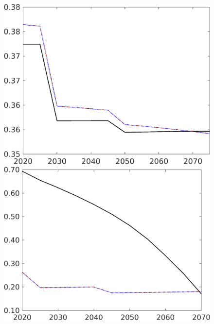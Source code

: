 \begin{figure}[h!!]
\begin{minipage}[]{0.32\textwidth}
	\end{minipage}
	\begin{minipage}[]{0.32\textwidth}
		\includegraphics[width=1\textwidth]{../../codding_model/own_basedOnFried/optimalPol_190722_tidiedUp/figures/all_July22/hl_CompEffOPT_T_NoTaus_pol4_spillover0_noskill1_sep1_xgrowth0_etaa0.79_lgd0_lff0.png}
	\end{minipage}
	\begin{minipage}[]{0.32\textwidth}
		\includegraphics[width=1\textwidth]{../../codding_model/own_basedOnFried/optimalPol_190722_tidiedUp/figures/all_July22/gAagg_CompEffOPT_T_NoTaus_pol4_spillover0_noskill1_sep1_xgrowth0_etaa0.79_lgd0_lff0.png}

\end{minipage}
\end{figure}
